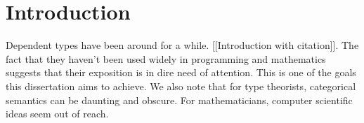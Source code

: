 \begin{comment}
\section{Introduction}

The goal of this thesis is to introduce dependent types to the undergraduate reader. We set out 

The goal of this dissertation is to learn how to mathematically design a programming language. 


The aim of this thesis is to introduce the notion of dependent types to an undergraduate reader. The main idea of dependent types is very simple, yet deceptively subtle however, since modelling such a formalism is quite tricky. This is evidenced by the fact that there is a lot of disagreement in type theory what has or hasn't been proven. This however is a familar story in mathematics and is usually remidied by trying to understand what has been done better. Usually with the help of a new persepctive. 

Dependent types however, are not only of interest to mathematicians but also programmers. Dependent type theory (much like simply typed lambda calculus) is very much a programming langauge allowing the expression of ideas previously too difficult to express. This is very much facilaiated by its deep connection to predicate logic.
\end{comment}

\section{Introduction}

Dependent types have been around for a while. [[Introduction with citation]]. The fact that they haven't been used widely in programming and mathematics suggests that their exposition is in dire need of attention. This is one of the goals this dissertation aims to achieve. We also note that for type theorists, categorical semantics can be daunting and obscure. For mathematicians, computer scientific ideas seem out of reach. 


